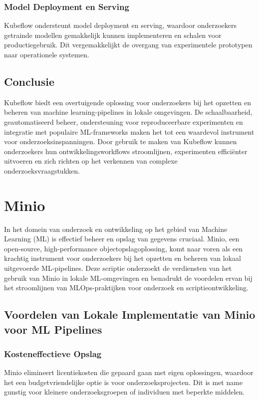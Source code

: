 \subsubsection{Model Deployment en Serving}
Kubeflow ondersteunt model deployment en serving, waardoor onderzoekers getrainde modellen gemakkelijk kunnen implementeren en schalen voor productiegebruik. Dit vergemakkelijkt de overgang van experimentele prototypen naar operationele systemen.

\subsection{Conclusie}

Kubeflow biedt een overtuigende oplossing voor onderzoekers bij het opzetten en beheren van machine learning-pipelines in lokale omgevingen. De schaalbaarheid, geautomatiseerd beheer, ondersteuning voor reproduceerbare experimenten en integratie met populaire ML-frameworks maken het tot een waardevol instrument voor onderzoeksinspanningen. Door gebruik te maken van Kubeflow kunnen onderzoekers hun ontwikkelingsworkflows stroomlijnen, experimenten efficiënter uitvoeren en zich richten op het verkennen van complexe onderzoeksvraagstukken.
\section{Minio}

In het domein van onderzoek en ontwikkeling op het gebied van Machine Learning (ML) is effectief beheer en opslag van gegevens cruciaal. Minio, een open-source, high-performance objectopslagoplossing, komt naar voren als een krachtig instrument voor onderzoekers bij het opzetten en beheren van lokaal uitgevoerde ML-pipelines. Deze scriptie onderzoekt de verdiensten van het gebruik van Minio in lokale ML-omgevingen en benadrukt de voordelen ervan bij het stroomlijnen van MLOps-praktijken voor onderzoek en scriptieontwikkeling.

\subsection{Voordelen van Lokale Implementatie van Minio voor ML Pipelines}

\subsubsection{Kosteneffectieve Opslag}
Minio elimineert licentiekosten die gepaard gaan met eigen oplossingen, waardoor het een budgetvriendelijke optie is voor onderzoeksprojecten. Dit is met name gunstig voor kleinere onderzoeksgroepen of individuen met beperkte middelen.

